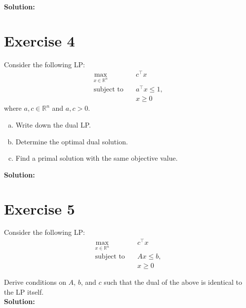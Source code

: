 \documentclass{article}
\begin{document}
\textbf{Solution:}



\newpage

\section*{Exercise 4}
Consider the following LP:
\begin{align*}
\max_{x \in \mathbb{R}^n} \quad & c^{\top} x \\
\text{subject to} \quad & a^{\top} x \leq 1, \\
& x \geq 0
\end{align*}
where $a, c \in \mathbb{R}^n$ and $a, c > 0$.

\begin{enumerate}[(a)]
    \item Write down the dual LP.
    \item Determine the optimal dual solution.
    \item Find a primal solution with the same objective value.
\end{enumerate}

\textbf{Solution:}



\newpage

\section*{Exercise 5}
Consider the following LP:
\begin{align*}
\max_{x \in \mathbb{R}^n} \quad & c^{\top} x \\
\text{subject to} \quad & Ax \leq b, \\
& x \geq 0
\end{align*}

Derive conditions on $A$, $b$, and $c$ such that the dual of the above is identical to the LP itself. \\

\textbf{Solution:}
\end{document}
